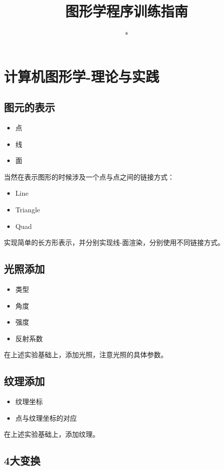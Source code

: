 \documentclass[UTF8,a4paper,12pt]{ctexart}
\author{\kaishu **}
\title{\heiti 图形学程序训练指南}
\begin{document}
 	\maketitle
  
\section{计算机图形学-理论与实践}
	\subsection{图元的表示}
		\begin{itemize}
			\item 点
			\item 线
			\item 面
		\end{itemize}
		
		当然在表示图形的时候涉及一个点与点之间的链接方式：
		\begin{itemize}
			\item Line
			\item Triangle
			\item Quad
		\end{itemize}
		
		实现简单的长方形表示，并分别实现线-面渲染，分别使用不同链接方式。
	\subsection{光照添加}
		\begin{itemize}
			\item  类型
			\item  角度
			\item  强度
			\item  反射系数
		\end{itemize}
		
		在上述实验基础上，添加光照，注意光照的具体参数。
	\subsection{纹理添加}
		\begin{itemize}
			\item  纹理坐标
			\item  点与纹理坐标的对应
		\end{itemize}
		
		在上述实验基础上，添加纹理。
		
	\subsection{4大变换}
	
\end{document}
